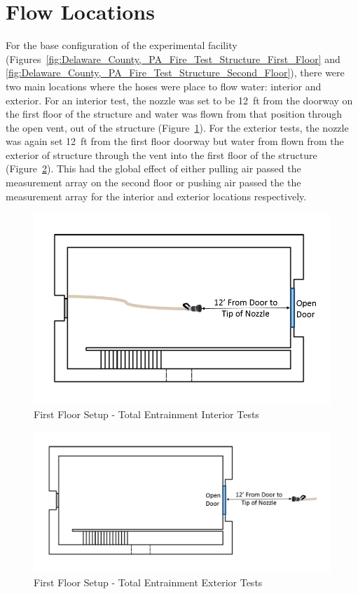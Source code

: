 \documentclass[12pt,oneside]{book}
\begin{document}
\clearpage

\section{Flow Locations}

For the base configuration of the experimental facility (Figures~\ref{fig:Delaware_County,_PA_Fire_Test_Structure_First_Floor} and \ref{fig:Delaware_County,_PA_Fire_Test_Structure_Second_Floor}), there were two main locations where the hoses were place to flow water: interior and exterior. For an interior test, the nozzle was set to be 12~ft from the doorway on the first floor of the structure and water was flown from that position through the open vent, out of the structure (Figure~\ref{fig:First_Floor_Setup_Total_Entrainment_Interior_Tests}). For the exterior tests, the nozzle was again set 12~ft from the first floor doorway but water from flown from the exterior of structure through the vent into the first floor of the structure (Figure~\ref{fig:First_Floor_Setup_Total_Entrainment_Exterior_Tests}). This had the global effect of either pulling air passed the measurement array on the second floor or pushing air passed the the measurement array for the interior and exterior locations respectively.

\begin{figure}[!ht]
	\centering
	\includegraphics[width=.6\columnwidth]{Figures/Air_Entrainment/Measurement_Locations_Firstfloor}
	\caption{First Floor Setup - Total Entrainment Interior Tests}
	\label{fig:First_Floor_Setup_Total_Entrainment_Interior_Tests}
\end{figure}

\begin{figure}[!ht]
	\centering
	\includegraphics[width=.95\columnwidth]{Figures/Air_Entrainment/Measurement_Locations_Firstfloor_Ext}
	\caption{First Floor Setup - Total Entrainment Exterior Tests}
	\label{fig:First_Floor_Setup_Total_Entrainment_Exterior_Tests}
\end{figure}
\end{document}

